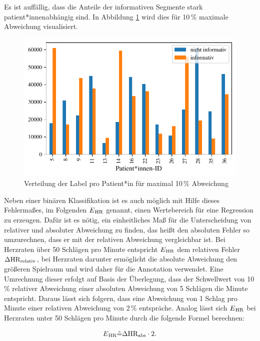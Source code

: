 	Es ist auffällig, dass die Anteile der informativen Segmente stark patient*innenabhängig sind. In Abbildung \ref{fig:data-stats-15} wird dies für 10\,\% maximale Abweichung visualisiert.
	
	\begin{figure}[H]
		\centering
		\includegraphics{pic/data-stats-10.pdf}
		\caption[Verteilung der Label pro Patient*in]{Verteilung der Label pro Patient*in für maximal 10\,\% Abweichung}
		\label{fig:data-stats-15}
	\end{figure}
	
	Neben einer binären Klassifikation ist es auch möglich mit Hilfe dieses Fehlermaßes, im Folgenden $E\textsubscript{HR}$ genannt, einen Wertebereich für eine Regression zu erzeugen. Dafür ist es nötig, ein einheitliches Maß für die Unterscheidung von relativer und absoluter Abweichung zu finden, das heißt den absoluten Fehler so umzurechnen, dass er mit der relativen Abweichung vergleichbar ist. Bei Herzraten über 50 Schlägen pro Minute entspricht $E\textsubscript{HR}$ dem relativen Fehler $\Delta\text{HR}\textsubscript{relativ}$, bei Herzraten darunter ermöglicht die absolute Abweichung den größeren Spielraum und wird daher für die Annotation verwendet. Eine Umrechnung dieser erfolgt auf Basis der Überlegung, dass der Schwellwert von 10\,\% relativer Abweichung einer absoluten Abweichung von 5 Schlägen die Minute entspricht. Daraus lässt sich folgern, dass eine Abweichung von 1 Schlag pro Minute einer relativen Abweichung von 2\,\% entspräche. Analog lässt sich $E\textsubscript{HR}$ bei Herzraten unter 50 Schlägen pro Minute durch die folgende Formel berechnen:
	
	\begin{align*}
		E\textsubscript{HR} \hat{=} \Delta\text{HR}\textsubscript{abs} \cdot 2.
	\end{align*}
	
